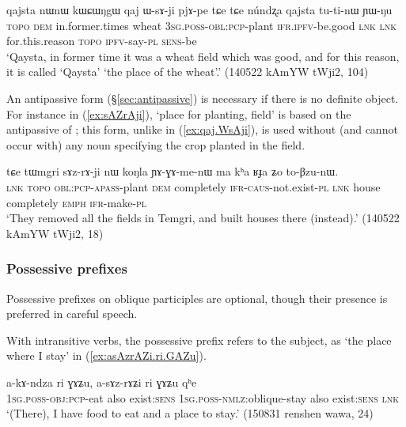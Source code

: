 \begin{exe}
\ex \label{ex:qaj.WsAji}
\gll  qajsta nɯnɯ kɯɕɯŋgɯ qaj ɯ-sɤ-ji pjɤ-pe tɕe tɕe núndʐa qajsta tu-ti-nɯ ɲɯ-ŋu \\
\textsc{topo} \textsc{dem} in.former.times wheat \textsc{3sg}.\textsc{poss}-\textsc{obl}:\textsc{pcp}-plant \textsc{ifr}.\textsc{ipfv}-be.good \textsc{lnk} \textsc{lnk} for.this.reason  \textsc{topo} \textsc{ipfv}-say-\textsc{pl} \textsc{sens}-be \\
\glt `Qaysta, in former time it was a wheat field which was good, and for this reason, it is called `Qaysta' `the place of the wheat'.' (140522 kAmYW tWji2, 104)
\end{exe}

An antipassive form (§\ref{sec:antipassive}) is necessary if there is no definite object. For instance in (\ref{ex:sAZrAji}),  `place for planting, field' is based on the  antipassive of ; this form, unlike  in (\ref{ex:qaj.WsAji}), is used without (and cannot occur with) any noun specifying the crop planted in the field.

\begin{exe}
\ex \label{ex:sAZrAji}
\gll  tɕe tɯmgri sɤz-rɤ-ji nɯ koŋla ɲɤ-ɣɤ-me-nɯ ma kʰa ʁɟa ʑo to-βzu-nɯ. \\
\textsc{lnk}  \textsc{topo} \textsc{obl}:\textsc{pcp}-\textsc{apass}-plant \textsc{dem} completely \textsc{ifr}-\textsc{caus}-not.exist-\textsc{pl} \textsc{lnk} house completely \textsc{emph} \textsc{ifr}-make-\textsc{pl} \\
\glt `They removed all the fields in Temgri, and built houses there (instead).' (140522 kAmYW tWji2, 18)
\end{exe}

 \subsubsection{Possessive prefixes} \label{sec:oblique.participle.possessive}
Possessive prefixes on oblique participles are optional, though their presence is preferred in careful speech.

With intransitive verbs, the possessive prefix refers to the subject, as  `the place where I stay' in (\ref{ex:asAzrAZi.ri.GAZu}).

\begin{exe}
\ex \label{ex:asAzrAZi.ri.GAZu}
\gll a-kɤ-ndza ri ɣɤʑu, a-sɤz-rɤʑi ri ɣɤʑu qʰe \\
\textsc{1sg}.\textsc{poss}-\textsc{obj}:\textsc{pcp}-eat also exist:\textsc{sens} \textsc{1sg}.\textsc{poss}-\textsc{nmlz}:oblique-stay also exist:\textsc{sens} \textsc{lnk} \\
\glt `(There), I have food to eat and a place to stay.' (150831 renshen wawa, 24)
\end{exe}


